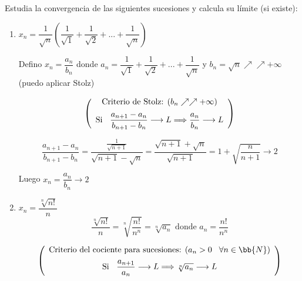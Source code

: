 \documentclass[12pt]{article}
\begin{document}
    \begin{ejercicio}[3 puntos]
        Estudia la convergencia de las siguientes sucesiones y calcula su límite (si existe):
        \begin{enumerate}
            \item $x_n = \dfrac{1}{\sqrt{n}}\left( \dfrac{1}{\sqrt{1}} +  \dfrac{1}{\sqrt{2}} + ... + \dfrac{1}{\sqrt{n}}\right)$ 

            Defino $x_n = \dfrac{a_n}{b_n}$ donde $a_n = \dfrac{1}{\sqrt{1}} +  \dfrac{1}{\sqrt{2}} + ... + \dfrac{1}{\sqrt{n}}$ y $b_n = \sqrt{n} \nearrow \nearrow +\infty$ (puedo aplicar Stolz)

            \[ \left(
                \begin{array}{c}
                    \text{Criterio de Stolz: }(b_n \nearrow \nearrow +\infty)\vspace{0.2cm}\\
                     \text{Si }\hspace{0.2cm} \dfrac{a_{n+1}-a_n}{b_{n+1}-b_n} \longrightarrow L \Longrightarrow \dfrac{a_n}{b_n} \longrightarrow L
                \end{array}
                \right)
            \]
            
            \[
                \dfrac{a_{n+1}-a_n}{b_{n+1}-b_n} = \dfrac{\frac{1}{\sqrt{n+1}}}{\sqrt{n+1} - \sqrt{n}}= \dfrac{\sqrt{n+1}+ \sqrt{n}}{\sqrt{n+1}} = 1 + \sqrt{\dfrac{n}{n+1}} \longrightarrow 2
            \]

            Luego $x_n = \dfrac{a_n}{b_n} \longrightarrow 2$

            
            \item $x_n = \dfrac{\sqrt[n]{n!}}{n}$
            \[
                \dfrac{\sqrt[n]{n!}}{n}= \sqrt[n]{\dfrac{n!}{n^n}} = \sqrt[n]{a_n} \text{ donde } a_n = \dfrac{n!}{n^n}
            \]

            \[ \left(
                \begin{array}{c}
                    \text{Criterio del cociente para sucesiones: }(a_n >0 \hspace{0.3cm} \forall n \in \bb{N})\vspace{0.2cm}\\
                     \text{Si }\hspace{0.2cm} \dfrac{a_{n+1}}{a_n} \longrightarrow L \Longrightarrow \sqrt[n]{a_n} \longrightarrow L
                \end{array}
                \right)
            \]


\end{enumerate}
\end{ejercicio}
\end{document}
